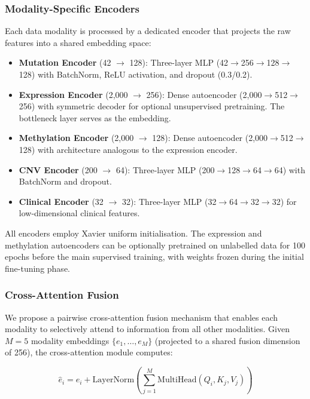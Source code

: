 \documentclass[journal,twoside]{IEEEtran}
\begin{document}
\subsubsection{Modality-Specific Encoders}
Each data modality is processed by a dedicated encoder that projects the
raw features into a shared embedding space:

\begin{itemize}
    \item \textbf{Mutation Encoder} (42 $\to$ 128): Three-layer MLP
    (42$\to$256$\to$128$\to$128) with BatchNorm, ReLU activation, and
    dropout (0.3/0.2).

    \item \textbf{Expression Encoder} (2,000 $\to$ 256): Dense autoencoder
    (2,000$\to$512$\to$256) with symmetric decoder for optional unsupervised
    pretraining. The bottleneck layer serves as the embedding.

    \item \textbf{Methylation Encoder} (2,000 $\to$ 128): Dense autoencoder
    (2,000$\to$512$\to$128) with architecture analogous to the expression
    encoder.

    \item \textbf{CNV Encoder} (200 $\to$ 64): Three-layer MLP
    (200$\to$128$\to$64$\to$64) with BatchNorm and dropout.

    \item \textbf{Clinical Encoder} (32 $\to$ 32): Three-layer MLP
    (32$\to$64$\to$32$\to$32) for low-dimensional clinical features.
\end{itemize}

All encoders employ Xavier uniform initialisation. The expression and
methylation autoencoders can be optionally pretrained on unlabelled data
for 100 epochs before the main supervised training, with weights frozen
during the initial fine-tuning phase.

\subsubsection{Cross-Attention Fusion}
\label{sec:fusion}

We propose a pairwise cross-attention fusion mechanism that enables each
modality to selectively attend to information from all other modalities. Given
$M = 5$ modality embeddings $\{e_1, \ldots, e_M\}$ (projected to a shared
fusion dimension of 256), the cross-attention module computes:

\begin{equation}
    \hat{e}_i = e_i + \text{LayerNorm}\left(\sum_{j=1}^{M}
    \text{MultiHead}(Q_i, K_j, V_j)\right)
\end{equation}
\end{document}

